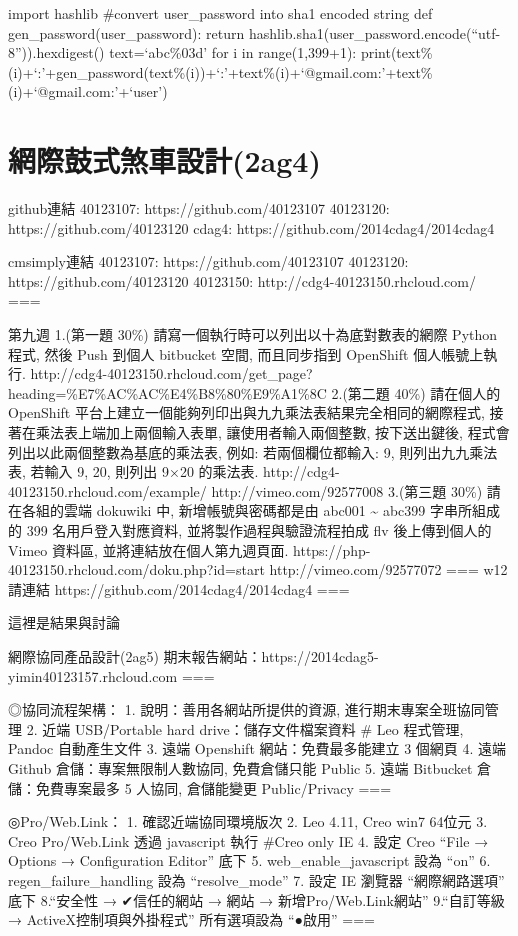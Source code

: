 \documentclass[]{article}
\begin{document}
import hashlib \#convert user\_password into sha1 encoded string def
gen\_password(user\_password): return
hashlib.sha1(user\_password.encode(``utf-8'')).hexdigest()
text=`abc\%03d' for i in range(1,399+1):
print(text\%(i)+`:'+gen\_password(text\%(i))+`:'+text\%(i)+`@gmail.com:'+text\%(i)+`@gmail.com:'+`user')

\section{網際鼓式煞車設計(2ag4)}\label{ux7db2ux969bux9f13ux5f0fux715eux8ecaux8a2dux8a082ag4}

github連結 40123107: https://github.com/40123107 40123120:
https://github.com/40123120 cdag4:
https://github.com/2014cdag4/2014cdag4

cmsimply連結 40123107: https://github.com/40123107 40123120:
https://github.com/40123120 40123150: http://cdg4-40123150.rhcloud.com/
===

第九週 1.(第一題 30\%) 請寫一個執行時可以列出以十為底對數表的網際 Python
程式, 然後 Push 到個人 bitbucket 空間, 而且同步指到 OpenShift
個人帳號上執行.
http://cdg4-40123150.rhcloud.com/get\_page?heading=\%E7\%AC\%AC\%E4\%B8\%80\%E9\%A1\%8C
2.(第二題 40\%) 請在個人的 OpenShift
平台上建立一個能夠列印出與九九乘法表結果完全相同的網際程式,
接著在乘法表上端加上兩個輸入表單, 讓使用者輸入兩個整數, 按下送出鍵後,
程式會列出以此兩個整數為基底的乘法表, 例如: 若兩個欄位都輸入: 9,
則列出九九乘法表, 若輸入 9, 20, 則列出 9×20 的乘法表.
http://cdg4-40123150.rhcloud.com/example/ http://vimeo.com/92577008
3.(第三題 30\%) 請在各組的雲端 dokuwiki 中, 新增帳號與密碼都是由 abc001
\textasciitilde{} abc399 字串所組成的 399 名用戶登入對應資料,
並將製作過程與驗證流程拍成 flv 後上傳到個人的 Vimeo 資料區,
並將連結放在個人第九週頁面.
https://php-40123150.rhcloud.com/doku.php?id=start
http://vimeo.com/92577072 === w12 請連結
https://github.com/2014cdag4/2014cdag4 ===

這裡是結果與討論

網際協同產品設計(2ag5)
期末報告網站：https://2014cdag5-yimin40123157.rhcloud.com ===

◎協同流程架構： 1. 說明：善用各網站所提供的資源,
進行期末專案全班協同管理 2. 近端 USB/Portable hard
drive：儲存文件檔案資料 \# Leo 程式管理, Pandoc 自動產生文件 3. 遠端
Openshift 網站：免費最多能建立 3 個網頁 4. 遠端 Github
倉儲：專案無限制人數協同, 免費倉儲只能 Public 5. 遠端 Bitbucket
倉儲：免費專案最多 5 人協同, 倉儲能變更 Public/Privacy ===

◎Pro/​Web.Link： 1. 確認近端協同環境版次 2. Leo 4.11, Creo win7 64位元
3. Creo Pro/​Web.Link 透過 javascript 執行 \#Creo only IE 4. 設定 Creo
``File → Options → Configuration Editor'' 底下 5.
web\_enable\_javascript 設為 ``on'' 6. regen\_failure\_handling 設為
``resolve\_mode'' 7. 設定 IE 瀏覽器 ``網際網路選項'' 底下 8.``安全性 →
✔信任的網站 → 網站 → 新增Pro/​Web.Link網站'' 9.``自訂等級 →
ActiveX控制項與外掛程式'' 所有選項設為 ``●啟用'' ===
\end{document}
